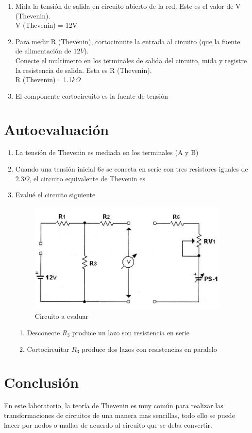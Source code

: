 \begin{enumerate}
	\item Mida la tensión de salida en circuito abierto de la red. Este es el valor de V (Thevenin). 
	\\ V (Thevenin) = 12V 
	\item Para medir R (Thevenin), cortocircuite la entrada al circuito (que la fuente de alimentación de $12V$).
	\\ Conecte el multímetro en los terminales de salida del circuito, mida y registre la resistencia de salida. Esta es R (Thevenin).
	\\ R (Thevenin)= 1.1$k\Omega$
	\item El componente cortocircuito es la fuente de tensión
\end{enumerate}
\section{Autoevaluación}
\begin{enumerate}
	\item La tensión de Thevenin es mediada en los terminales (A y B)
	\item Cuando una tensión inicial $6v$ se conecta en serie con tres resistores iguales de $2.3\Omega$, el circuito equivalente de Thevenin es
	\item Evalué el circuito siguiente
	\begin{figure}[h]
		\centering 
		\includegraphics[scale=1]{imagenes/4.1}
		\caption{Circuito a evaluar}
	\end{figure}
	\begin{enumerate}
		\item Desconecte $R_{3}$ produce un lazo son resistencia en serie 
		\item Cortocircuitar $R_{3}$ produce dos lazos con resistencias en paralelo
	\end{enumerate}
\end{enumerate}
\section{Conclusión}
En este laboratorio, la teoría de Thevenin es muy común para realizar las transformaciones de circuitos de una manera mas sencillas, todo ello se puede hacer por nodos o mallas de acuerdo al circuito que se deba convertir.
